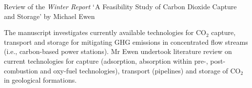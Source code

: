 \documentclass[14pt,twoside]{report}
\begin{document}
\clearpage




\vfill

\clearpage







\bigskip

\begin{center}
  {\Large Review of the {\it Winter Report} $\lq$A Feasibility Study of Carbon Dioxide Capture and Storage' by Michael Ewen}
\end{center}

The manuscript investigates currently available technologies for CO$_{2}$ capture, transport and storage for mitigating GHG emissions in concentrated flow streams (i.e., carbon-based power stations). Mr Ewen undertook  literature review on current technologies for capture (adsorption, absorption within pre-, post-combustion and oxy-fuel technologies), transport (pipelines) and storage of CO$_{2}$ in geological formations.
\end{document}
